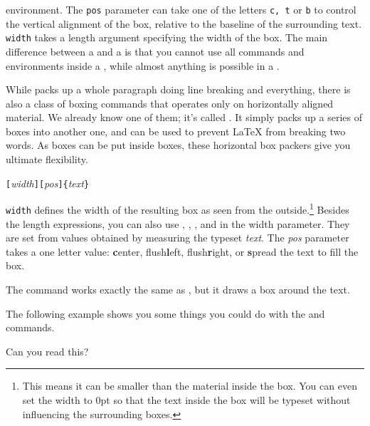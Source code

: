 \noindent environment. The \texttt{pos} parameter can take one of the letters
\texttt{c, t} or \texttt{b} to control the vertical alignment of the box,
relative to the baseline of the surrounding text. \texttt{width} takes
a length argument specifying the width of the box. The main difference
between a  and a  is that you cannot use all commands
and environments inside a , while almost anything is possible in
a .

While  packs up a whole paragraph doing line breaking and
everything, there is also a class of boxing commands that operates
only on horizontally aligned material. We already know one of them;
it's called . It simply packs up a series of boxes into
another one, and can be used to prevent \LaTeX{} from breaking two
words. As boxes can be put inside boxes, these horizontal box packers
give you ultimate flexibility.

\begin{lscommand}
\verb|[|\emph{width}\verb|][|\emph{pos}\verb|]{|\emph{text}\verb|}|
\end{lscommand}

\noindent \texttt{width} defines the width of the resulting box as
seen from the outside.\footnote{This means it can be smaller than the
material inside the box. You can even set the
width to 0pt so that the text inside the box will be typeset without
influencing the surrounding boxes.}  Besides the length
expressions, you can also use , , , and
 in the width parameter. They are set from values
obtained by measuring the typeset \emph{text}. The \emph{pos} parameter takes
a one letter value: \textbf{c}enter, flush\textbf{l}eft,
flush\textbf{r}ight, or \textbf{s}pread the text to fill the box.

The command  works exactly the same as , but
it draws a box around the text.

The following example shows you some things you could do with
the  and  commands.

\begin{example}
\par
{}\par
{} \par
{} \par
{} 
Can you read this?
\end{example}


